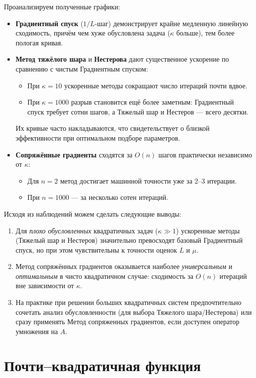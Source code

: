 \documentclass[a4paper]{article}
\begin{document}
Проанализируем полученные графики:
\begin{itemize}
  \item \textbf{Градиентный спуск} (\(1/L\)-шаг) демонстрирует крайне медленную линейную сходимость, причём чем хуже обусловлена задача (\(\kappa\) больше), тем более пологая кривая.
  \item \textbf{Метод тяжёлого шара} и \textbf{Нестерова} дают существенное ускорение по сравнению с чистым Градиентным спуском:  
    \begin{itemize}
      \item При \(\kappa=10\) ускоренные методы сокращают число итераций почти вдвое.
      \item При \(\kappa=1000\) разрыв становится ещё более заметным: Градиентный спуск требует сотни шагов, а Тяжелый шар и Нестеров — всего десятки.
    \end{itemize}
    Их кривые часто накладываются, что свидетельствует о близкой эффективности при оптимальном подборе параметров.
  \item \textbf{Сопряжённые градиенты} сходятся за \(O(n)\) шагов практически независимо от \(\kappa\):  
    \begin{itemize}
      \item Для \(n=2\) метод достигает машинной точности уже за 2–3 итерации.
      \item При \(n=1000\) — за несколько сотен итераций.
    \end{itemize}
\end{itemize}

Исходя из наблюдений можем сделать следующие выводы:
\begin{enumerate}
  \item Для \emph{плохо обусловленных} квадратичных задач (\(\kappa\gg1\)) ускоренные методы (Тяжелый шар и Нестеров) значительно превосходят базовый Градиентный спуск, но при этом чувствительны к точности оценок \(L\) и \(\mu\).
  \item Метод сопряжённых градиентов оказывается наиболее \emph{универсальным} и \emph{оптимальным} в чисто квадратичном случае: сходимость за \(O(n)\) итераций вне зависимости от \(\kappa\).
  \item На практике при решении больших квадратичных систем предпочтительно сочетать анализ обусловленности (для выбора Тяжелого шара/Нестерова) или сразу применять Метод сопряженных градиентов, если доступен оператор умножения на \(A\).
\end{enumerate}

\section{Почти–квадратичная функция}
\end{document}

